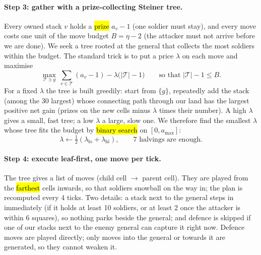 \paragraph{Step 3: gather with a prize-collecting Steiner tree.} Every owned stack $v$ holds a \hl{prize}
$a_v-1$ (one soldier must stay), and every move costs one unit of the move budget $B=\eta-2$ (the attacker must
not arrive before we are done). We seek a tree rooted at the general that collects the most soldiers within the
budget. The standard trick is to put a price $\lambda$ on each move and maximise
\begin{equation}
\max_{\mathcal{T}\ni g}\ \sum_{v\in\mathcal{T}}(a_v-1)-\lambda\big(|\mathcal{T}|-1\big)\qquad\text{so that }|\mathcal{T}|-1\le B.
\end{equation}
For a fixed $\lambda$ the tree is built greedily: start from $\{g\}$, repeatedly add the stack (among the 30
largest) whose connecting path through our land has the largest positive net gain (prizes on the new cells
minus $\lambda$ times their number). A high $\lambda$ gives a small, fast tree; a low $\lambda$ a large, slow
one. We therefore find the smallest $\lambda$ whose tree fits the budget by \hl{binary search} on
$[0,a_{\max}]$:
\begin{equation}
\lambda\leftarrow\tfrac12(\lambda_{\text{lo}}+\lambda_{\text{hi}}),\qquad\text{7 halvings are enough.}
\end{equation}

\paragraph{Step 4: execute leaf-first, one move per tick.} The tree gives a list of moves (child cell $\to$
parent cell). They are played from the \hl{farthest} cells inwards, so that soldiers snowball on the way in; the
plan is recomputed every 4 ticks. Two details: a stack next to the general steps in immediately (if it holds at
least 10 soldiers, or at least 2 once the attacker is within 6 squares), so nothing parks beside the general;
and defence is skipped if one of our stacks next to the enemy general can capture it right now. Defence moves are played directly; only moves into the general or towards it are generated, so they cannot
weaken it.

